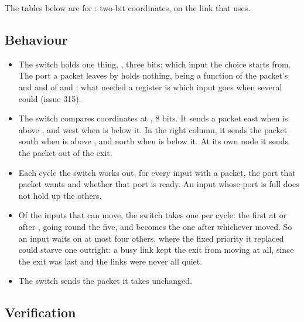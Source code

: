 The tables below are for : two-bit
coordinates, on the link that  uses.


\subsection*{Behaviour}

\begin{itemize}
\item The switch holds one thing, , three bits: which
input the choice starts from. The port a packet leaves by holds
nothing, being a function of the packet's  and  and
of  and ; what needed a register is which input goes
when several could (issue 315).
\item The switch compares coordinates at , 8 bits. It sends a
packet east when  is above , and west when 
is below it. In the right column, it sends the packet south when
 is above , and north when  is below it. At its own node it sends the packet out of the exit.
\item Each cycle the switch works out, for every input with a packet,
the port that packet wants and whether that port is ready. An input
whose port is full does not hold up the others.
\item Of the inputs that can move, the switch takes one per cycle: the
first at or after , going round the five, and 
becomes the one after whichever moved. So an input waits on at most
four others, where the fixed priority it replaced could starve one
outright: a busy link kept the exit from moving at all, since the exit
was last and the links were never all quiet.
\item The switch sends the packet it takes unchanged.
\end{itemize}

\subsection*{Verification}

